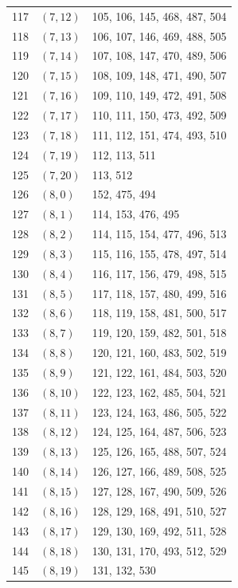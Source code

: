 \documentclass{article}
\begin{document}
\begin{longtable}{lll}
  117 & \((7, 12)\) & 105, 106, 145, 468, 487, 504 \\
  118 & \((7, 13)\) & 106, 107, 146, 469, 488, 505 \\
  119 & \((7, 14)\) & 107, 108, 147, 470, 489, 506 \\
  120 & \((7, 15)\) & 108, 109, 148, 471, 490, 507 \\
  121 & \((7, 16)\) & 109, 110, 149, 472, 491, 508 \\
  122 & \((7, 17)\) & 110, 111, 150, 473, 492, 509 \\
  123 & \((7, 18)\) & 111, 112, 151, 474, 493, 510 \\
  124 & \((7, 19)\) & 112, 113, 511 \\
  125 & \((7, 20)\) & 113, 512 \\
  126 & \((8, 0)\) & 152, 475, 494 \\
  127 & \((8, 1)\) & 114, 153, 476, 495 \\
  128 & \((8, 2)\) & 114, 115, 154, 477, 496, 513 \\
  129 & \((8, 3)\) & 115, 116, 155, 478, 497, 514 \\
  130 & \((8, 4)\) & 116, 117, 156, 479, 498, 515 \\
  131 & \((8, 5)\) & 117, 118, 157, 480, 499, 516 \\
  132 & \((8, 6)\) & 118, 119, 158, 481, 500, 517 \\
  133 & \((8, 7)\) & 119, 120, 159, 482, 501, 518 \\
  134 & \((8, 8)\) & 120, 121, 160, 483, 502, 519 \\
  135 & \((8, 9)\) & 121, 122, 161, 484, 503, 520 \\
  136 & \((8, 10)\) & 122, 123, 162, 485, 504, 521 \\
  137 & \((8, 11)\) & 123, 124, 163, 486, 505, 522 \\
  138 & \((8, 12)\) & 124, 125, 164, 487, 506, 523 \\
  139 & \((8, 13)\) & 125, 126, 165, 488, 507, 524 \\
  140 & \((8, 14)\) & 126, 127, 166, 489, 508, 525 \\
  141 & \((8, 15)\) & 127, 128, 167, 490, 509, 526 \\
  142 & \((8, 16)\) & 128, 129, 168, 491, 510, 527 \\
  143 & \((8, 17)\) & 129, 130, 169, 492, 511, 528 \\
  144 & \((8, 18)\) & 130, 131, 170, 493, 512, 529 \\
  145 & \((8, 19)\) & 131, 132, 530 \\

\end{longtable}
\end{document}
